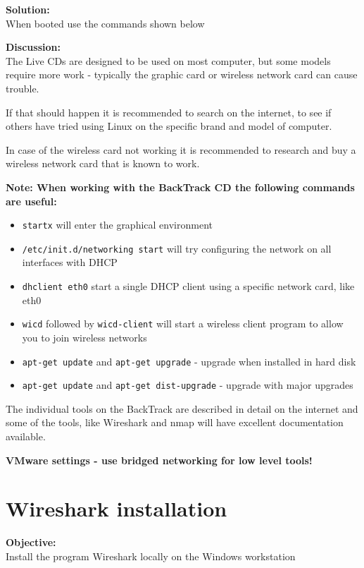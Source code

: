 \documentclass[a4paper,11pt,notitlepage]{report}
\begin{document}
{\bf Solution:}\\
When booted use the commands shown below

{\bf Discussion:}\\
The Live CDs are designed to be used on most computer, but some models
require more work - typically the graphic card or wireless network card can cause trouble.

If that should happen it is recommended to search on the internet, to see if others have tried using Linux on the specific brand and model of computer.

In case of the wireless card not working it is recommended to research and buy
a wireless network card that is known to work.

{\bf Note: When working with the BackTrack CD the following commands are useful:}
\begin{itemize}
\item \verb+startx+ will enter the graphical environment
\item \verb+/etc/init.d/networking start+ will try configuring the network on all interfaces with DHCP
\item \verb+dhclient eth0+ start a single DHCP client using a specific network card, like eth0
\item \verb+wicd+ followed by \verb+wicd-client+ will start a wireless client program to allow you to join wireless networks
\item \verb+apt-get update+ and \verb+apt-get upgrade+ - upgrade when installed in hard disk
\item \verb+apt-get update+ and \verb+apt-get dist-upgrade+ - upgrade with major upgrades
\end{itemize}

The individual tools on the BackTrack are described in detail on the internet and some of the tools, like Wireshark and nmap will have excellent documentation available.

{\bf VMware settings - use bridged networking for low level tools!}

\chapter{Wireshark installation}
\label{ex:wireshark}



{\bf Objective:}\\
Install the program Wireshark locally on the Windows workstation
\end{document}
